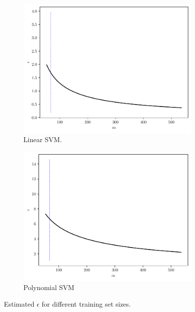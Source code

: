 \documentclass[conference]{IEEEtran}
\theoremstyle{definition}
\theoremstyle{remark}
\theoremstyle{remark}
\begin{document}
\begin{figure}
    \centering
    \begin{subfigure}[b]{0.45\textwidth}
        \centering
        \includegraphics[width=\textwidth]{figs/svm-linear-error.pdf}
        \caption{Linear SVM.}
    \end{subfigure}
    \begin{subfigure}[b]{0.45\textwidth}
        \centering
        \includegraphics[width=\textwidth]{figs/svm-poly-error.pdf}
        \caption{Polynomial SVM}
    \end{subfigure}
    \caption{Estimated $\epsilon$ for different training set sizes.}
    \label{fig:error-SVM}
\end{figure}
\end{document}
